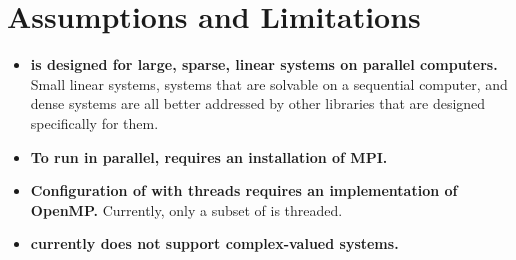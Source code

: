 
\section{Assumptions and Limitations}

\begin{itemize}

\item
{\bf \hypre{} is designed for large, sparse, linear systems on
parallel computers.}  Small linear systems, systems that are solvable
on a sequential computer, and dense systems are all better addressed
by other libraries that are designed specifically for them.

\item
{\bf To run in parallel, \hypre{} requires an installation of MPI.}

\item
{\bf Configuration of \hypre{} with threads requires an implementation
of OpenMP.}  Currently, only a subset of \hypre{} is threaded.

\item
{\bf \hypre{} currently does not support complex-valued systems.}

\end{itemize}
